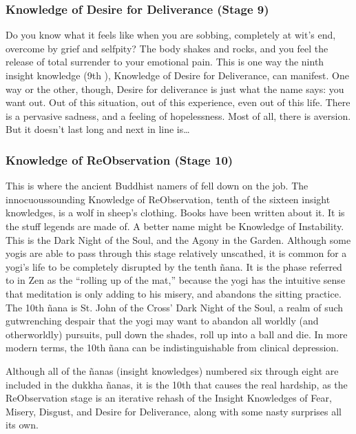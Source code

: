 \documentclass[a5paper,10pt,english]{book}
\begin{document}
\subsubsection{Knowledge of Desire for Deliverance (Stage 9)}
\label{\detokenize{main-2:knowledge-of-desire-for-deliverance-stage-9}}
\sphinxAtStartPar
Do you know what it feels like when you are sobbing, completely at wit’s
end, overcome by grief and self\sphinxhyphen{}pity? The body shakes and rocks, and you
feel the release of total surrender to your emotional pain. This is one
way the ninth insight knowledge (9th ), Knowledge of Desire for
Deliverance, can manifest. One way or the other, though, Desire for
deliverance is just what the name says: you want out. Out of this
situation, out of this experience, even out of this life. There is a
pervasive sadness, and a feeling of hopelessness. Most of all, there is
aversion. But it doesn’t last long and next in line is…


\subsubsection{Knowledge of Re\sphinxhyphen{}Observation (Stage 10)}
\label{\detokenize{main-2:knowledge-of-re-observation-stage-10}}
\sphinxAtStartPar
This is where the ancient Buddhist namers of  fell down on the
job. The innocuous\sphinxhyphen{}sounding Knowledge of Re\sphinxhyphen{}Observation, tenth of the
sixteen insight knowledges, is a wolf in sheep’s clothing. Books have
been written about it. It is the stuff legends are made of. A better
name might be Knowledge of Instability. This is the Dark Night of the
Soul, and the Agony in the Garden. Although some yogis are able to pass
through this stage relatively unscathed, it is common for a yogi’s life
to be completely disrupted by the tenth ñana. It is the phase referred
to in Zen as the “rolling up of the mat,” because the yogi has the
intuitive sense that meditation is only adding to his misery, and
abandons the sitting practice. The 10th ñana is St. John of the Cross’
Dark Night of the Soul, a realm of such gut\sphinxhyphen{}wrenching despair that the
yogi may want to abandon all worldly (and otherworldly) pursuits, pull
down the shades, roll up into a ball and die. In more modern terms, the
10th ñana can be indistinguishable from clinical depression.

\sphinxAtStartPar
Although all of the ñanas (insight knowledges) numbered six through
eight are included in the dukkha ñanas, it is the 10th that causes the
real hardship, as the Re\sphinxhyphen{}Observation stage is an iterative rehash of the
Insight Knowledges of Fear, Misery, Disgust, and Desire for Deliverance,
along with some nasty surprises all its own.
\end{document}
